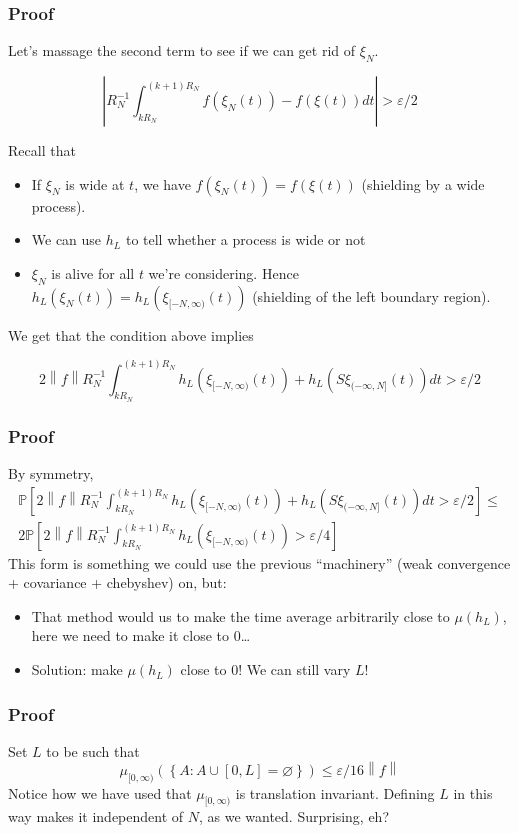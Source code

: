 \documentclass{beamer}
\newcommand{\norm}[1]{{\left\lVert#1\right\rVert}}
\begin{document}
\begin{frame}
    \frametitle{Proof}
    Let's massage the second term to see if we can get rid of $\xi_N$.

    \[
        \left|R_N^{-1}\int_{kR_N}^{(k+1)R_N}f(\xi_N(t)) - f(\xi(t))dt \right| > \varepsilon/2 
    \]

    Recall that 
    \begin{itemize}
        \item If $\xi_N$ is wide at $t$, we have $f(\xi_N(t)) = f(\xi(t))$ (shielding by a wide process). 
        \item We can use $h_L$ to tell whether a process is wide or not
        \item $\xi_N$ is alive for all $t$ we're considering. Hence $h_L(\xi_N(t)) = h_L(\xi_{[-N,\infty)}(t))$ (shielding of the left boundary region).
    \end{itemize}
    We get that the condition above implies

    \[
        2\norm{f}R_N^{-1}\int_{kR_N}^{(k+1)R_N}h_L(\xi_{[-N, \infty)}(t)) + h_L(S\xi_{(-\infty, N]}(t))dt > \varepsilon/2
    \]
\end{frame}


\begin{frame}
    \frametitle{Proof}
    By symmetry,
    \begin{gather*}
        \mathbb{P}\left[  2\norm{f}R_N^{-1}\int_{kR_N}^{(k+1)R_N}h_L(\xi_{[-N, \infty)}(t)) + h_L(S\xi_{(-\infty, N]}(t))dt > \varepsilon/2 \right] \leq \\
        2\mathbb{P}\left[ 2\norm{f}R_N^{-1}\int_{kR_N}^{(k+1)R_N}h_L(\xi_{[-N, \infty)}(t)) > \varepsilon/4 \right]
    \end{gather*}
    This form is something we could use the previous ``machinery'' (weak convergence + covariance + chebyshev) on, but:
    \begin{itemize}
        \item That method would us to make the time average arbitrarily close to $\mu(h_L)$, here we need to make it close to 0\dots
        \item Solution: make $\mu(h_L)$ close to 0! We can still vary $L$!
    \end{itemize}
\end{frame}

\begin{frame}
    \frametitle{Proof}
    Set $L$ to be such that 
    \[
        \mu_{[0, \infty)}\left( \left\{ A : A \cup [0,L] = \varnothing \right\} \right) \leq \varepsilon/16\norm{f}
    \]
    Notice how we have used that $\mu_{[0, \infty)}$ is translation invariant. Defining $L$ in this way makes it independent of $N$, as we wanted.
    Surprising, eh?
\end{frame}
\end{document}
